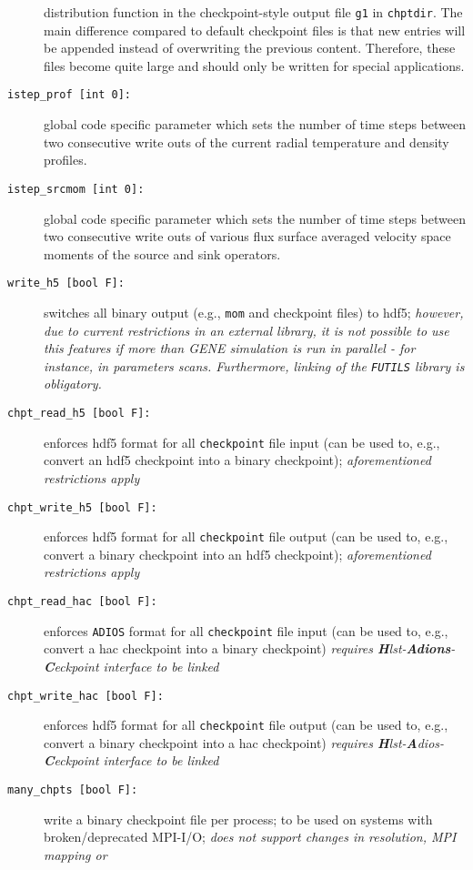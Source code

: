 \documentclass[12pt]{article}
\begin{document}
\begin{description}
distribution function in the checkpoint-style output file {\tt g1} in {\tt chptdir}.
The main difference compared to default checkpoint files is that new entries will be appended instead
of overwriting the previous content. Therefore, these files become quite large and should only be
written for special applications.
\item[\hypertarget{istep_prof}{\tt istep\_prof [int 0]:}] global code specific parameter which sets the number of
time steps between two consecutive write outs of the current radial temperature and density profiles.
\item[\hypertarget{istep_srcmom}{\tt istep\_srcmom [int 0]:}] global code specific parameter which sets the number of
time steps between two consecutive write outs of various flux surface averaged velocity space moments
of the source and sink operators.
\item[\texttt{write\_h5 [bool F]:}] switches all binary output (e.g., {\tt mom} and checkpoint files)
to hdf5; {\em however, due to current restrictions in an external library, it is not possible to use this features
if more than GENE simulation is run in parallel - for instance, in parameters scans. Furthermore,
linking of the {\tt FUTILS} library is obligatory.}
\item[\texttt{chpt\_read\_h5 [bool F]:}] enforces hdf5 format for all {\tt checkpoint} file input
(can be used to, e.g., convert an hdf5 checkpoint into a binary checkpoint);
{\em aforementioned restrictions apply}
\item[\texttt{chpt\_write\_h5 [bool F]:}] enforces hdf5 format for all {\tt checkpoint} file output
(can be used to, e.g., convert a binary checkpoint into an hdf5 checkpoint);
{\em aforementioned restrictions apply}
\item[\texttt{chpt\_read\_hac [bool F]:}] enforces {\tt ADIOS} format for all {\tt checkpoint} file input
(can be used to, e.g., convert a hac checkpoint into a binary checkpoint)
{\em requires {\bf H}lst-{\bf Adions}-{\bf C}eckpoint interface to be linked}
\item[\texttt{chpt\_write\_hac [bool F]:}] enforces hdf5 format for all {\tt checkpoint} file output
(can be used to, e.g., convert a binary checkpoint into a hac checkpoint)
{\em requires {\bf H}lst-{\bf A}dios-{\bf C}eckpoint interface to be linked}
\item[\texttt{many\_chpts [bool F]:}] write a binary checkpoint file per process; to be used
on systems with broken/deprecated MPI-I/O; {\em does not support changes in resolution, MPI mapping or
}
\end{description}
\end{document}

